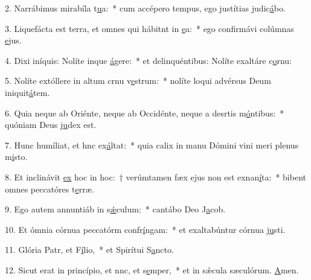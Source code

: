 2. Narrábimus mirabíla t\uline{u}a:~* cum accépero tempus, ego justítias judic\uline{á}bo.\par 
3. Liquefácta est terra, et omnes qui hábitnt in \uline{e}a:~* ego confirmávi colúmnas \uline{e}jus.\par 
4. Dixi iníquis: Nolíte inque \uline{á}gere:~* et delinquéntibus: Nolíte exaltáre c\uline{o}rnu:\par 
5. Nolíte extóllere in altum crnu v\uline{e}strum:~* nolíte loqui advérsus Deum iniquit\uline{á}tem.\par 
6. Quia neque ab Oriénte, neque ab Occidénte, neque a desrtis m\uline{ó}ntibus:~* quóniam Deus j\uline{u}dex est.\par 
7. Hunc humíliat, et hnc ex\uline{á}ltat:~* quia calix in manu Dómini vini meri plenus m\uline{i}sto.\par 
8. Et inclinávit \uline{ex} hoc in hoc:~† verúmtamen fæx ejus non est exnan\uline{í}ta:~* bibent omnes peccatóres t\uline{e}rræ.\par 
9. Ego autem annuntiáb in s\uline{ǽ}culum:~* cantábo Deo J\uline{a}cob.\par 
10. Et ómnia córnua peccatórm confr\uline{í}ngam:~* et exaltabúntur córnua j\uline{u}sti.\par 
11. Glória Patr, et F\uline{í}lio,~* et Spirítui S\uline{a}ncto.\par 
12. Sicut erat in princípio, et nnc, et s\uline{e}mper,~* et in sǽcula sæculórum. \uline{A}men.\par 
